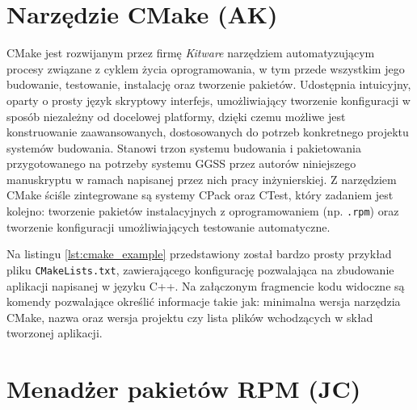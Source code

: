 \clearpage
\section{Narzędzie CMake (AK)}
CMake jest rozwijanym przez firmę \emph{Kitware} narzędziem automatyzującym procesy związane z cyklem życia oprogramowania, w tym przede wszystkim jego budowanie, testowanie, instalację oraz tworzenie pakietów. Udostępnia intuicyjny, oparty o prosty język skryptowy interfejs, umożliwiający tworzenie konfiguracji w sposób niezależny od docelowej platformy, dzięki czemu możliwe jest konstruowanie zaawansowanych, dostosowanych do potrzeb konkretnego projektu systemów budowania. Stanowi trzon systemu budowania i pakietowania przygotowanego na potrzeby systemu GGSS przez autorów niniejszego manuskryptu w ramach napisanej przez nich pracy inżynierskiej. Z narzędziem CMake ściśle zintegrowane są systemy CPack oraz CTest, który zadaniem jest kolejno: tworzenie pakietów instalacyjnych z oprogramowaniem (np. \lstinline{.rpm}) oraz tworzenie konfiguracji umożliwiających testowanie automatyczne.

Na listingu \ref{lst:cmake_example} przedstawiony został bardzo prosty przykład pliku \lstinline{CMakeLists.txt}, zawierającego konfigurację pozwalająca na zbudowanie aplikacji napisanej w języku C++. Na załączonym fragmencie kodu widoczne są komendy pozwalające określić informacje takie jak: minimalna wersja narzędzia CMake, nazwa oraz wersja projektu czy lista plików wchodzących w skład tworzonej aplikacji.






\section{Menadżer pakietów RPM (JC)}
